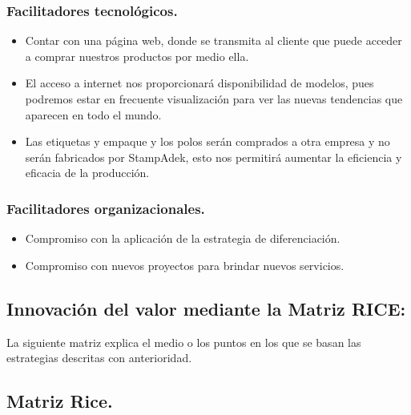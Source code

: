 \documentclass[a4paper,openright,12pt]{book}
\begin{document}
\subsubsection{Facilitadores tecnológicos.}
\begin{itemize}
\item Contar con una página web, donde se transmita al cliente que puede acceder a comprar nuestros productos por medio ella.
\item El acceso a internet nos proporcionará disponibilidad de modelos, pues podremos estar en frecuente visualización para ver las nuevas tendencias que aparecen en todo el mundo.
\item Las etiquetas y empaque y los polos serán comprados a otra empresa y no serán fabricados por StampAdek, esto nos permitirá aumentar la eficiencia y eficacia de la producción.
\end{itemize}

\subsubsection{Facilitadores organizacionales.}
\begin{itemize}
\item Compromiso con la aplicación de la estrategia de diferenciación.
\item Compromiso con nuevos proyectos para brindar nuevos servicios.
\end{itemize}

\subsection{Innovación del valor mediante la Matriz RICE:}
La siguiente matriz explica el medio o los puntos en los que se basan las estrategias descritas con anterioridad.

\subsection{Matriz Rice.}
\end{document}
